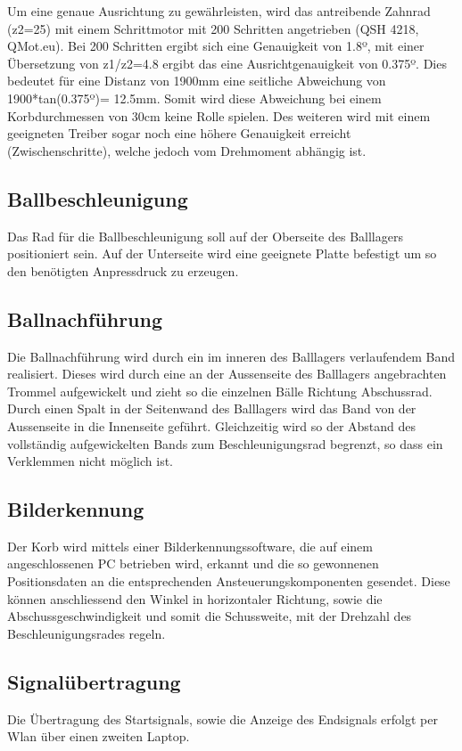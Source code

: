 Um eine genaue Ausrichtung zu gewährleisten, wird das antreibende Zahnrad (z2=25) mit einem Schrittmotor mit 200 Schritten angetrieben (QSH 4218, QMot.eu). Bei 200 Schritten ergibt sich eine Genauigkeit von 1.8º, mit einer Übersetzung von z1/z2=4.8 ergibt das eine Ausrichtgenauigkeit von 0.375º. Dies bedeutet für eine Distanz von 1900mm eine seitliche Abweichung von 1900*tan(0.375º)= 12.5mm. Somit wird diese Abweichung bei einem Korbdurchmessen von 30cm keine Rolle spielen. Des weiteren wird mit einem geeigneten Treiber sogar noch eine höhere Genauigkeit erreicht (Zwischenschritte), welche jedoch vom Drehmoment abhängig ist. 

\subsection{Ballbeschleunigung}
Das Rad für die Ballbeschleunigung soll auf der Oberseite des Balllagers 
positioniert sein. Auf der Unterseite wird eine geeignete Platte befestigt um 
so den benötigten Anpressdruck zu erzeugen. 

\subsection{Ballnachführung}
Die Ballnachführung wird durch ein im inneren des Balllagers verlaufendem Band 
realisiert. Dieses wird durch eine an der Aussenseite des Balllagers 
angebrachten Trommel aufgewickelt und zieht so die einzelnen Bälle Richtung 
Abschussrad. Durch einen Spalt in der Seitenwand des Balllagers wird das Band von der Aussenseite in die Innenseite geführt. Gleichzeitig wird so der Abstand des vollständig aufgewickelten Bands zum Beschleunigungsrad begrenzt, so dass ein Verklemmen nicht möglich ist.

\subsection{Bilderkennung}
Der Korb wird mittels einer Bilderkennungssoftware, die auf einem 
angeschlossenen PC betrieben wird, erkannt und die so gewonnenen 
Positionsdaten an die entsprechenden Ansteuerungskomponenten gesendet. Diese 
können anschliessend den Winkel in horizontaler Richtung, sowie die 
Abschussgeschwindigkeit und somit die Schussweite, mit der Drehzahl des 
Beschleunigungsrades regeln.

\subsection{Signalübertragung}
Die Übertragung des Startsignals, sowie die Anzeige des Endsignals erfolgt per 
Wlan über einen zweiten Laptop.
